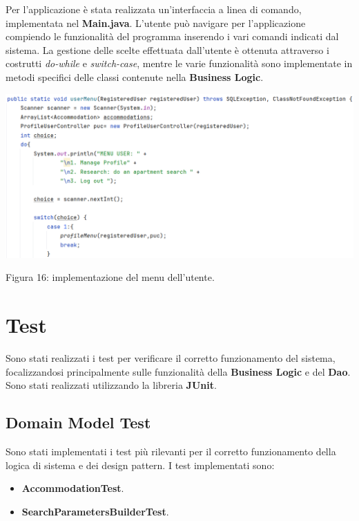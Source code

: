 \documentclass[10pt]{article}
\begin{document}
Per l'applicazione è stata realizzata un'interfaccia a linea di comando, implementata nel \textbf{Main.java}. L'utente può navigare per l'applicazione compiendo le funzionalità del programma inserendo i vari comandi indicati dal sistema. La gestione delle scelte effettuata dall'utente è ottenuta attraverso i costrutti \textit{do-while} e \textit{switch-case}, mentre le varie funzionalità sono implementate in metodi specifici delle classi contenute nella \textbf{Business Logic}.

\begin{center}
\hspace*{-0.75cm}
\includegraphics[scale=0.6]{cli/usermenu}
\par\medskip
Figura 16: implementazione del menu dell'utente.
\par\medskip
\end{center} 

\section{Test}

Sono stati realizzati i test per verificare il corretto funzionamento del sistema, focalizzandosi principalmente sulle funzionalità della \textbf{Business Logic} e del \textbf{Dao}. Sono stati realizzati utilizzando la libreria \textbf{JUnit}. 

\subsection{Domain Model Test}

Sono stati implementati i test più rilevanti per il corretto funzionamento della logica di sistema e dei design pattern.
I test implementati sono: 
\begin{itemize}
\item \textbf{AccommodationTest}.
\item \textbf{SearchParametersBuilderTest}.
\end{itemize}
\end{document}
